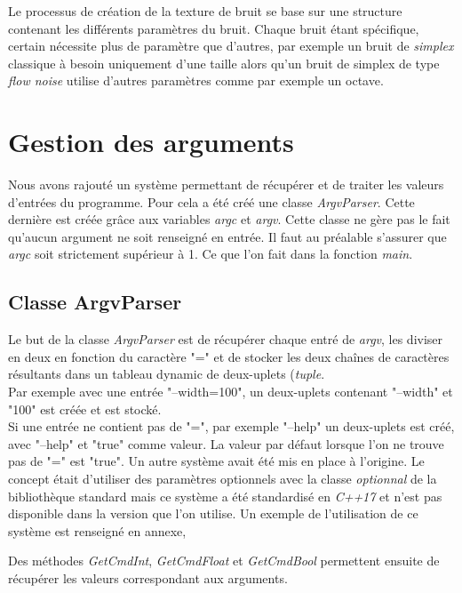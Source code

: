   Le processus de création de la texture de bruit se base sur une structure contenant les différents paramètres du bruit.
  Chaque bruit étant spécifique, certain nécessite plus de paramètre que d'autres, par exemple un bruit de \textit{simplex} classique à besoin uniquement d'une taille alors qu'un bruit
  de simplex de type \textit{flow noise} utilise d'autres paramètres comme par exemple un octave. 
  
  \section{Gestion des arguments}
  Nous avons rajouté un système permettant de récupérer et de traiter les valeurs d'entrées du programme.
  Pour cela a été créé une classe \textit{ArgvParser}. Cette dernière est créée grâce aux variables \textit{argc} et \textit{argv}. 
  Cette classe ne gère pas le fait qu'aucun argument ne soit renseigné en entrée. Il faut au préalable s'assurer que \textit{argc} soit strictement supérieur à 1. Ce que l'on fait dans la fonction \textit{main}.\\
  
  \subsection{Classe ArgvParser}
  
  Le but de la classe \textit{ArgvParser} est de récupérer chaque entré de \textit{argv}, les diviser en deux en fonction du caractère "=" et de stocker les deux chaînes de caractères résultants dans un tableau dynamic de deux-uplets (\textit{tuple}.\\
  
  Par exemple avec une entrée "--width=100", un deux-uplets contenant "--width" et "100" est créée et est stocké.\\
  Si une entrée ne contient pas de "=", par exemple "--help" un deux-uplets est créé, avec "--help" et "true" comme valeur. La valeur par défaut lorsque l'on ne trouve pas de "=" est "true".
  Un autre système avait été mis en place à l'origine. Le concept était d'utiliser des paramètres optionnels
  avec la classe \textit{optionnal} de la bibliothèque standard mais ce système a été standardisé en \textit{C++17} et n'est pas disponible dans la version que l'on utilise. Un exemple de l'utilisation de ce système est renseigné en annexe, 
  
  Des méthodes \textit{GetCmdInt}, \textit{GetCmdFloat} et \textit{GetCmdBool} permettent ensuite de récupérer les valeurs correspondant aux arguments.
  
